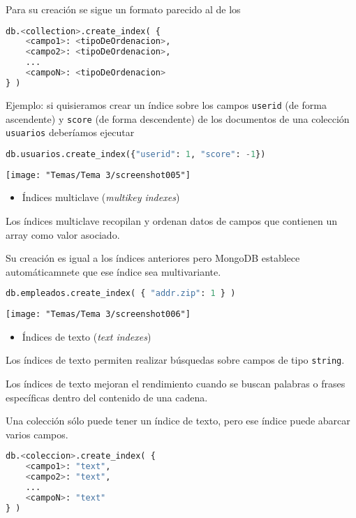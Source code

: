 Para su creación se sigue un formato parecido al de los 
\begin{lstlisting}[language=python]
db.<collection>.create_index( {
	<campo1>: <tipoDeOrdenacion>,
	<campo2>: <tipoDeOrdenacion>,
	...
	<campoN>: <tipoDeOrdenacion>
} )
\end{lstlisting}
Ejemplo: si quisieramos crear un índice sobre los campos \texttt{userid} (de forma ascendente) y \texttt{score} (de forma descendente) de los documentos de una colección \texttt{usuarios} deberíamos ejecutar
\begin{lstlisting}[language=python]
	db.usuarios.create_index({"userid": 1, "score": -1})
\end{lstlisting}
\begin{center}
	\texttt{[image: "Temas/Tema 3/screenshot005"]}
\end{center}
\begin{itemize}[label=\color{red}\textbullet, leftmargin=*]
	\item \color{lightblue}Índices multiclave (\textit{multikey indexes})
\end{itemize}
Los índices multiclave recopilan y ordenan datos de campos que contienen un array como valor asociado.

Su creación es igual a los índices anteriores pero MongoDB establece automáticamnete que ese índice sea multivariante.
\begin{lstlisting}[language=python]
db.empleados.create_index( { "addr.zip": 1 } )
\end{lstlisting}
\begin{center}
	\texttt{[image: "Temas/Tema 3/screenshot006"]}
\end{center}
\begin{itemize}[label=\color{red}\textbullet, leftmargin=*]
	\item \color{lightblue}Índices de texto (\textit{text indexes})
\end{itemize}
Los índices de texto permiten realizar búsquedas sobre campos de tipo \texttt{string}.

Los índices de texto mejoran el rendimiento cuando se buscan palabras o frases específicas dentro del contenido de una cadena.

Una colección sólo puede tener un índice de texto, pero ese índice puede abarcar varios campos.
\begin{lstlisting}[language=python]
db.<coleccion>.create_index( {
	<campo1>: "text",
	<campo2>: "text",
	...
	<campoN>: "text"
} )
\end{lstlisting}
\Ej


